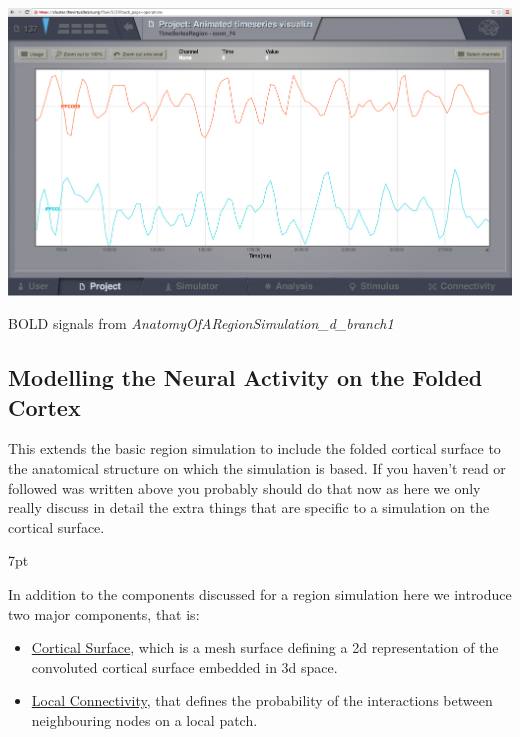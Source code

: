 \documentclass{tufte-handout}
\newenvironment{blah}{%
  \def\FrameCommand{%
    \hspace{1pt}%
    {\color{DarkOrange}\vrule width 2pt}%
    {\color{PeachPuff}\vrule width 4pt}%
    \colorbox{PeachPuff}%
  }%
  \MakeFramed{\advance\hsize-\width\FrameRestore}%
  \noindent\hspace{-4.55pt}%
  \begin{adjustwidth}{}{7pt}%
  \vspace{2pt}\vspace{2pt}%
}
{%
  \vspace{2pt}\end{adjustwidth}\endMakeFramed%
}
\begin{document}
\begin{marginfigure}%
\includegraphics[width=\linewidth]{Handout_UI_BuildingYourOwnBrainNetworkModel_BOLD}%
  \caption{BOLD signals from \textit{AnatomyOfARegionSimulation\_d\_branch1}}%
  \label{fig:BOLD}%
\end{marginfigure}


\subsection{Modelling the Neural Activity on the Folded Cortex}\label{sec:surface_simulations}

This extends the basic region simulation to include the folded cortical surface to the anatomical structure on which the simulation is based. If you haven't read or followed was written above you probably should do that now as here we only really discuss in detail the extra things that are specific to a simulation on the cortical surface.

\begin{blah}
In addition to the components discussed for a
region simulation here we introduce two major components, that is:
\begin{itemize}
\item \underline{Cortical Surface}, which is a mesh surface defining
a 2d representation of the convoluted cortical surface embedded in 3d space.
\item \underline{Local Connectivity}, that defines the probability of the interactions between neighbouring nodes on a local patch. 
\end{itemize}
\end{blah}
\end{document}
